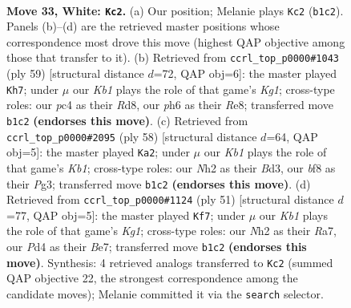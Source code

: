 \documentclass[11pt]{article}
\begin{document}
\clearpage

\begin{figure}[p]\centering
\begin{subfigure}{0.46\textwidth}\centering
\resizebox{\linewidth}{!}{%
\newchessgame
\chessboard[
  setfen={rk3b2/1p4pr/p1p1b2p/P4p2/2pP3P/2B1P3/1P3PPN/RK5R w - - 0 33},
  showmover=false,
  pgfstyle=straightmove, color=movearrow, markmove={b1-c2}
]}
\caption{}
\end{subfigure}\hfill
\begin{subfigure}{0.46\textwidth}\centering
\resizebox{\linewidth}{!}{%
\newchessgame
\chessboard[
  setfen={3rrbk1/p4p2/1p1ppP1p/7p/P1PBP3/1P6/6PP/4RRK1 b - - 1 30},
  showmover=false,
  pgfstyle=straightmove, color=movearrow, markmove={g8-h7}
]}
\caption{}
\end{subfigure}
\\[4pt]
\begin{subfigure}{0.46\textwidth}\centering
\resizebox{\linewidth}{!}{%
\newchessgame
\chessboard[
  setfen={4k1r1/1r2pp2/3p3p/p2P2b1/Pp6/3B1PPR/1PP5/1K4R1 w - - 5 30},
  showmover=false,
  pgfstyle=straightmove, color=movearrow, markmove={b1-a2}
]}
\caption{}
\end{subfigure}\hfill
\begin{subfigure}{0.46\textwidth}\centering
\resizebox{\linewidth}{!}{%
\newchessgame
\chessboard[
  setfen={2r3k1/r3b1pp/1p2pp2/p1n5/2PR4/4B1P1/PP3P1P/3R1BK1 b - - 3 26},
  showmover=false,
  pgfstyle=straightmove, color=movearrow, markmove={g8-f7}
]}
\caption{}
\end{subfigure}
\caption{\textbf{Move 33, White: \texttt{Kc2}.} (a) Our position; Melanie plays \texttt{Kc2} (\texttt{b1c2}). Panels (b)--(d) are the retrieved master positions whose correspondence most drove this move (highest QAP objective among those that transfer to it). (b) Retrieved from \texttt{ccrl\_top\_p0000\#1043} (ply 59) [structural distance $d$=72, QAP obj=6]: the master played \texttt{Kh7}; under $\mu$ our \emph{Kb1} plays the role of that game's \emph{Kg1}; cross-type roles: our \emph{p}c4 as their \emph{R}d8, our \emph{p}h6 as their \emph{R}e8; transferred move \texttt{b1c2} \textbf{(endorses this move)}. (c) Retrieved from \texttt{ccrl\_top\_p0000\#2095} (ply 58) [structural distance $d$=64, QAP obj=5]: the master played \texttt{Ka2}; under $\mu$ our \emph{Kb1} plays the role of that game's \emph{Kb1}; cross-type roles: our \emph{N}h2 as their \emph{B}d3, our \emph{b}f8 as their \emph{P}g3; transferred move \texttt{b1c2} \textbf{(endorses this move)}. (d) Retrieved from \texttt{ccrl\_top\_p0000\#1124} (ply 51) [structural distance $d$=77, QAP obj=5]: the master played \texttt{Kf7}; under $\mu$ our \emph{Kb1} plays the role of that game's \emph{Kg1}; cross-type roles: our \emph{N}h2 as their \emph{R}a7, our \emph{P}d4 as their \emph{B}e7; transferred move \texttt{b1c2} \textbf{(endorses this move)}. Synthesis: 4 retrieved analogs transferred to \texttt{Kc2} (summed QAP objective 22, the strongest correspondence among the candidate moves); Melanie committed it via the \texttt{search} selector.}
\label{fig:thought-m64}
\end{figure}
\end{document}
